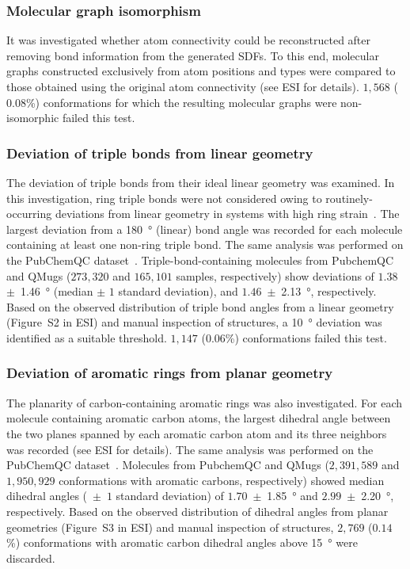 \subsubsection*{Molecular graph isomorphism}
It was investigated whether atom connectivity could be reconstructed after removing bond information from the generated SDFs. To this end, molecular graphs constructed exclusively from atom positions and types were compared to those obtained using the original atom connectivity (see ESI for details). $1,568$ ($0.08$\%) conformations for which the resulting molecular graphs were non-isomorphic failed this test.

\subsubsection*{Deviation of triple bonds from linear geometry}
The deviation of triple bonds from their ideal linear geometry was examined. In this investigation, ring triple bonds were not considered owing to routinely-occurring deviations from linear geometry in systems with high ring strain~\cite{bach2009ring}. The largest deviation from a \SI{180}{\degree} (linear) bond angle was recorded for each molecule containing at least one non-ring triple bond. The same analysis was performed on the PubChemQC dataset~\cite{nakata2017pubchemqc}. Triple-bond-containing molecules from PubchemQC and QMugs ($273,320$ and $165,101$ samples, respectively) show deviations of $1.38$~$\pm$~\SI{1.46}{\degree} (median $\pm$ $1$ standard deviation), and $1.46$~$\pm$~\SI{2.13}{\degree}, respectively. Based on the observed distribution of triple bond angles from a linear geometry (Figure~S2 in ESI) and manual inspection of structures, a \SI{10}{\degree} deviation was identified as a suitable threshold. $1,147$ ($0.06$\%) conformations failed this test.

\subsubsection*{Deviation of aromatic rings from planar geometry}
The planarity of carbon-containing aromatic rings was also investigated. For each molecule containing aromatic carbon atoms, the largest dihedral angle between the two planes spanned by each aromatic carbon atom and its three neighbors was recorded (see ESI for details). The same analysis was performed on the PubChemQC dataset~\cite{nakata2017pubchemqc}. Molecules from PubchemQC and QMugs ($2,391,589$ and $1,950,929$ conformations with aromatic carbons, respectively) showed median dihedral angles (~$\pm$~$1$ standard deviation) of $1.70$~$\pm$~\SI{1.85}{\degree} and $2.99$~$\pm$~\SI{2.20}{\degree}, respectively. Based on the observed distribution of dihedral angles from planar geometries (Figure~S3 in ESI) and manual inspection of structures, $2,769$ ($0.14$\%) conformations with aromatic carbon dihedral angles above \SI{15}{\degree} were discarded.




